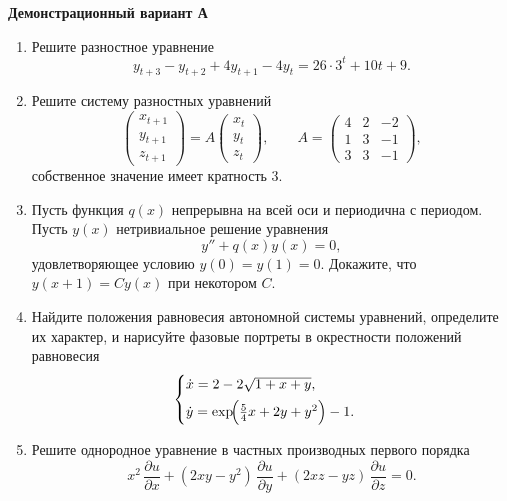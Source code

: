 \documentclass[12pt]{article}
\begin{document}
\begin{center}
\textbf{Демонстрационный вариант А}
\end{center}

\begin{enumerate}
\item Решите разностное уравнение
\[
y_{t+3}-y_{t+2}+4y_{t+1}-4y_{t} = 26 \cdot 3^{t} + 10t + 9.
\]

\item Решите систему разностных уравнений
\[
\begin{pmatrix}
x_{t+1}\\[2pt]
y_{t+1}\\[2pt]
z_{t+1}
\end{pmatrix}
=
A
\begin{pmatrix}
x_{t}\\[2pt]
y_{t}\\[2pt]
z_{t}
\end{pmatrix},
\qquad
A=
\begin{pmatrix}
4 & 2 & -2\\
1 & 3 & -1\\
3 & 3 & -1
\end{pmatrix},
\]
собственное значение имеет кратность $3$.

\item Пусть функция $q(x)$ непрерывна на всей оси и периодична с периодом. Пусть $y(x)$ нетривиальное решение уравнения
\[
y'' + q(x)y(x)=0,
\]
удовлетворяющее условию $y(0)=y(1)=0$. Докажите, что $y(x+1)=Cy(x)$ при некотором $C$.

\item Найдите положения равновесия автономной системы уравнений, определите их характер, и нарисуйте фазовые портреты в окрестности положений равновесия
\[
\begin{cases}
\dot{x}=2-2\sqrt{1+x+y},\\[4pt]
\dot{y}=\exp\!\Bigl(\tfrac{5}{4}x+2y+y^{2}\Bigr)-1.
\end{cases}
\]

\item Решите однородное уравнение в частных производных первого порядка
\[
x^{2}\,\frac{\partial u}{\partial x}
+(2xy-y^{2})\,\frac{\partial u}{\partial y}
+(2xz-yz)\,\frac{\partial u}{\partial z}=0.
\]
\end{enumerate}
\end{document}
